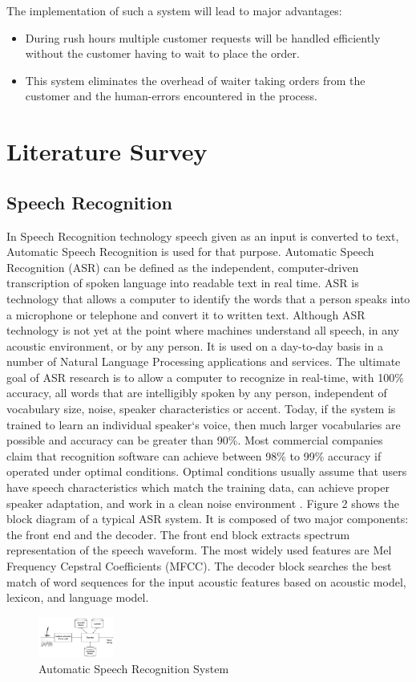 \documentclass[conference]{IEEEtran}
\begin{document}
The implementation of such a system will lead to major advantages: 
\begin{itemize}
	\item During rush hours multiple customer requests will be handled efficiently without the customer having to wait to place the order. 
	\item This system eliminates the overhead of waiter taking orders from the customer and the human-errors encountered in the process. 
\end{itemize}


\section{Literature Survey}

\subsection{\textbf{Speech Recognition}}
In Speech Recognition technology speech given as an input is converted to text, Automatic Speech Recognition is used for that purpose. Automatic Speech Recognition (ASR) can be defined as the independent, computer-driven transcription of spoken language into readable text in real time. ASR is technology that allows a computer to identify the words that a person speaks into a microphone or telephone and convert it to written text. Although ASR technology is not yet at the point where machines understand all speech, in any acoustic environment, or by any person. It is used on a day-to-day basis in a number of Natural Language Processing applications and services. 
The ultimate goal of ASR research is to allow a computer to recognize in real-time, with 100\% accuracy, all words that are intelligibly spoken by any person, independent of vocabulary size, noise, speaker characteristics or accent. Today, if the system is trained to learn an individual speaker‘s voice, then much larger vocabularies are possible and accuracy can be greater than 90\%. Most commercial companies claim that recognition software can achieve between 98\% to 99\% accuracy if operated under optimal conditions. Optimal conditions usually assume that users have speech characteristics which match the training data, can achieve proper speaker adaptation, and work in a clean noise environment \cite{b1}. 
Figure 2 shows the block diagram of a typical ASR system. It is composed of two major components: the front end and the decoder. The front end block extracts spectrum representation of the speech waveform. The most widely used features are Mel Frequency Cepstral Coefficients (MFCC)\cite{b2}. The decoder block searches the best match of word sequences for the input acoustic features based on acoustic model, lexicon, and language model. 
\begin{figure}[!ht]
	\centering
	\includegraphics[width=0.222\textwidth]{ASR.png}
	\caption{Automatic Speech Recognition System\cite{b3}}
\end{figure}\\
\end{document}
